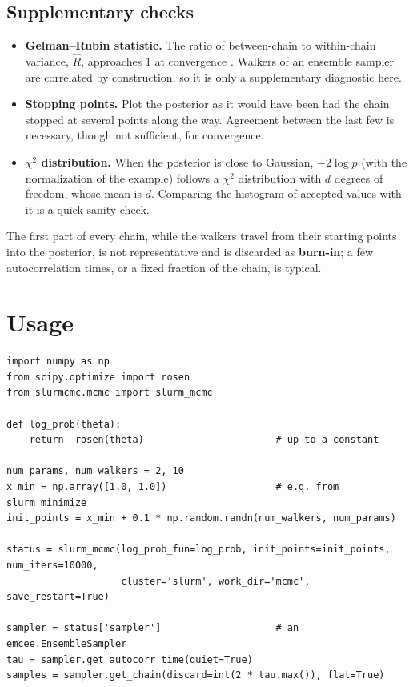 \subsection{Supplementary checks}

\begin{itemize}
  \item \textbf{Gelman--Rubin statistic.} The ratio of between-chain to within-chain variance,
        $\hat R$, approaches 1 at convergence \citep{gelman1992}. Walkers of an ensemble sampler are correlated by
        construction, so it is only a supplementary diagnostic here.
  \item \textbf{Stopping points.} Plot the posterior as it would have been had the chain stopped at
        several points along the way. Agreement between the last few is necessary, though not
        sufficient, for convergence.
  \item \textbf{$\chi^2$ distribution.} When the posterior is close to Gaussian,
        $-2\log p$ (with the normalization of the example) follows a $\chi^2$ distribution with
        $d$ degrees of freedom, whose mean is $d$. Comparing the histogram of accepted values with
        it is a quick sanity check.
\end{itemize}

The first part of every chain, while the walkers travel from their starting points into the
posterior, is not representative and is discarded as \textbf{burn-in}; a few autocorrelation
times, or a fixed fraction of the chain, is typical.

\section{Usage}

\begin{lstlisting}
import numpy as np
from scipy.optimize import rosen
from slurmcmc.mcmc import slurm_mcmc

def log_prob(theta):
    return -rosen(theta)                       # up to a constant

num_params, num_walkers = 2, 10
x_min = np.array([1.0, 1.0])                   # e.g. from slurm_minimize
init_points = x_min + 0.1 * np.random.randn(num_walkers, num_params)

status = slurm_mcmc(log_prob_fun=log_prob, init_points=init_points, num_iters=10000,
                    cluster='slurm', work_dir='mcmc', save_restart=True)

sampler = status['sampler']                    # an emcee.EnsembleSampler
tau = sampler.get_autocorr_time(quiet=True)
samples = sampler.get_chain(discard=int(2 * tau.max()), flat=True)
\end{lstlisting}

